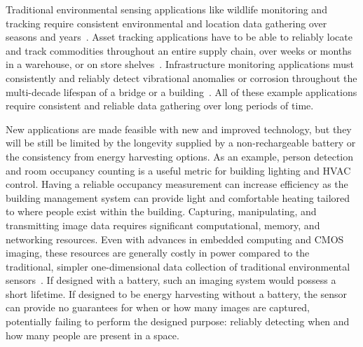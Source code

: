 Traditional environmental sensing applications like wildlife monitoring and tracking require consistent environmental and location data gathering over seasons and years~\cite{mainwaring2002wireless,juang2002energy}.
Asset tracking applications have to be able to reliably locate and track commodities throughout an entire supply chain, over weeks or months in a warehouse, or on store shelves~\cite{williotpixel}.
Infrastructure monitoring applications must consistently and reliably detect vibrational anomalies or corrosion throughout the multi-decade lifespan of a bridge or a building~\cite{afanasov2020battery,jagtap2021repurposing}.
All of these example applications require consistent and reliable data gathering over long periods of time.

New applications are made feasible with new and improved technology, but they will be still be limited by the longevity supplied by a non-rechargeable battery or the consistency from energy harvesting options.
As an example, person detection and room occupancy counting is a useful metric for building lighting and HVAC control.
Having a reliable occupancy measurement can increase efficiency as the building management system can provide light and comfortable heating tailored to where people exist within the building. 
Capturing, manipulating, and transmitting image data requires significant computational, memory, and networking resources. 
Even with advances in embedded computing and CMOS imaging, these resources are generally costly in power compared to the traditional, simpler one-dimensional data collection of traditional environmental sensors~\cite{mainwaring2002wireless,desai2022camaroptera}. 
If designed with a battery, such an imaging system would possess a short lifetime. If designed to be energy harvesting without a battery, the sensor can provide no guarantees for when or how many images are captured, potentially failing to perform the designed purpose: reliably detecting when and how many people are present in a space. 

